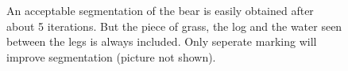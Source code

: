 \documentclass[11pt,a4paper]{article}
\begin{document}
\begin{figure}
\centering
{}
\quad
{}

\caption{An acceptable segmentation of the bear is easily obtained after about 5 iterations. But the piece of grass, the log and the water seen between the legs is always included. Only seperate marking will improve segmentation (picture not shown).}%

\end{figure}
\end{document}
